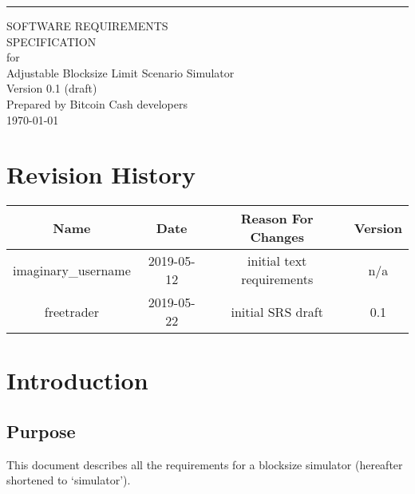 \documentclass{scrreprt}
\date{}
\def\myversion{0.1 }
\begin{document}
\begin{flushright}
    \rule{16cm}{5pt}\vskip1cm
    \begin{bfseries}
        \Huge{SOFTWARE REQUIREMENTS\\ SPECIFICATION}\\
        \vspace{1.9cm}
        for\\
        \vspace{1.9cm}
        Adjustable Blocksize Limit Scenario Simulator\\
        \vspace{1.9cm}
        \LARGE{Version \myversion (draft)}\\
        \vspace{1.9cm}
        Prepared by Bitcoin Cash developers\\
        \vspace{1.9cm}
        \today\\
    \end{bfseries}
\end{flushright}

\tableofcontents


\chapter*{Revision History}

\begin{center}
    \begin{tabular}{|c|c|c|c|}
        \hline
	    Name & Date & Reason For Changes & Version\\
        \hline
	    imaginary_username & 2019-05-12 & initial text requirements & n/a\\
        \hline
	    freetrader & 2019-05-22 & initial SRS draft & 0.1\\
        \hline
    \end{tabular}
\end{center}

\chapter{Introduction}


\section{Purpose}
This document describes all the requirements for a blocksize simulator
(hereafter shortened to `simulator').
\end{document}
